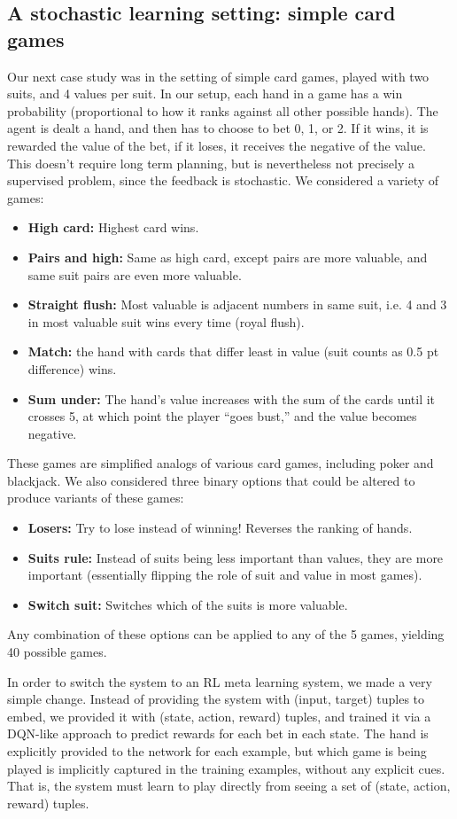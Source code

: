 \documentclass[11pt]{article}
\begin{document}
\subsection{A stochastic learning setting: simple card games}
Our next case study was in the setting of simple card games, played with two suits, and 4 values per suit. In our setup, each hand in a game has a win probability (proportional to how it ranks against all other possible hands). The agent is dealt a hand, and then has to choose to bet 0, 1, or 2. If it wins, it is rewarded the value of the bet, if it loses, it receives the negative of the value. This doesn't require long term planning, but is nevertheless not precisely a supervised problem, since the feedback is stochastic. We considered a variety of games:
\begin{itemize}
\item \textbf{High card:} Highest card wins.
\item \textbf{Pairs and high:} Same as high card, except pairs are more valuable, and same suit pairs are even more valuable.
\item \textbf{Straight flush:} Most valuable is adjacent numbers in same suit, i.e. 4 and 3 in most valuable suit wins every time (royal flush).
\item \textbf{Match:} the hand with cards that differ least in value (suit counts as 0.5 pt difference) wins.
\item \textbf{Sum under:} The hand's value increases with the sum of the cards until it crosses 5, at which point the player ``goes bust,'' and the value becomes negative. 
\end{itemize}
These games are simplified analogs of various card games, including poker and blackjack. We also considered three binary options that could be altered to produce variants of these games:
\begin{itemize}
\item \textbf{Losers:} Try to lose instead of winning! Reverses the ranking of hands.
\item \textbf{Suits rule:} Instead of suits being less important than values, they are more important (essentially flipping the role of suit and value in most games).
\item \textbf{Switch suit:} Switches which of the suits is more valuable.
\end{itemize}
Any combination of these options can be applied to any of the 5 games, yielding 40 possible games. \par
In order to switch the system to an RL meta learning system, we made a very simple change. Instead of providing the system with (input, target) tuples to embed, we provided it with (state, action, reward) tuples, and trained it via a DQN-like approach \citep{} to predict rewards for each bet in each state. The hand is explicitly provided to the network for each example, but which game is being played is implicitly captured in the training examples, without any explicit cues. That is, the system must learn to play directly from seeing a set of (state, action, reward) tuples. \par   
\end{document}
